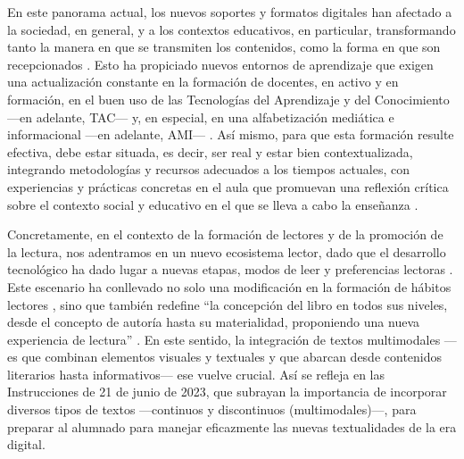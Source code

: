 \documentclass[spanish]{textolivre}
\begin{document}
En este panorama actual, los nuevos soportes y formatos digitales han afectado a la sociedad, en general, y a los contextos educativos, en particular, transformando tanto la manera en que se transmiten los contenidos, como la forma en que son recepcionados \cite{heredia_tecnicas_2019,tabernero_habitos_2020}. Esto ha propiciado nuevos entornos de aprendizaje que exigen una actualización constante en la formación de docentes, en activo y en formación, en el buen uso de las Tecnologías del Aprendizaje y del Conocimiento —en adelante, TAC— \cite{alvarez_tac_2017} y, en especial, en una alfabetización mediática e informacional —en adelante, AMI— \cite{santiago_del_pino_consulta_2019}. Así mismo, para que esta formación resulte efectiva, debe estar situada, es decir, ser real y estar bien contextualizada, integrando metodologías y recursos adecuados a los tiempos actuales, con experiencias y prácticas concretas en el aula que promuevan una reflexión crítica sobre el contexto social y educativo en el que se lleva a cabo la enseñanza \cite{imbernon_ser_2017,castaneda_quintero_formacion_2019,rovira-collado_intertextualidad_2021}.

Concretamente, en el contexto de la formación de lectores y de la promoción de la lectura, nos adentramos en un nuevo ecosistema lector, dado que el desarrollo tecnológico ha dado lugar a nuevas etapas, modos de leer y preferencias lectoras \cite{tabernero_habitos_2020}. Este escenario ha conllevado no solo una modificación en la formación de hábitos lectores \cite{tabernero_leer_2022b}, sino que también redefine “la concepción del libro en todos sus niveles, desde el concepto de autoría hasta su materialidad, proponiendo una nueva experiencia de lectura” \cite[p. 74]{samperiz_libro_2020}. En este sentido, la integración de textos multimodales —es que combinan elementos visuales y textuales y que abarcan desde contenidos literarios hasta informativos— ese vuelve crucial.  Así se refleja en las Instrucciones de 21 de junio de 2023, que subrayan la importancia de incorporar diversos tipos de textos —continuos y discontinuos (multimodales)—, para preparar al alumnado para manejar eficazmente las nuevas textualidades de la era digital.
\end{document}
